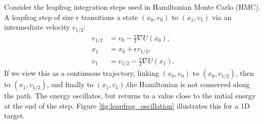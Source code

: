 \documentclass{article}
\begin{document}

Consider the leapfrog integration steps used in Hamiltonian Monte Carlo (HMC). A leapfrog step of size $\epsilon$ transitions a state $(x_0, v_0)$ to $(x_1, v_1)$ via an intermediate velocity $v_{1/2}$:
\begin{align*}
    v_{1/2} &= v_0 - \frac{\epsilon}{2} \nabla U(x_0), \\
    x_1 &= x_0 + \epsilon v_{1/2}, \\
    v_1 &= v_{1/2} - \frac{\epsilon}{2} \nabla U(x_1).
\end{align*}
If we view this as a continuous trajectory, linking $(x_0, v_0)$ to $(x_0, v_{1/2})$, then to $(x_1, v_{1/2})$, and finally to $(x_1, v_1)$,the Hamiltonian is not conserved along the path. The energy oscillates, but returns to a value close to the initial energy at the end of the step. Figure \ref{fig:leapfrog_oscillation} illustrates this for a 1D target.
\end{document}
